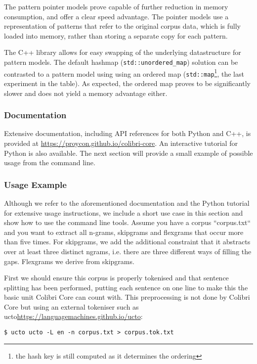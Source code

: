 \documentclass[a4paper,12pt]{article}
\begin{document}
The pattern pointer models prove capable of further reduction in memory
consumption, and offer a clear speed advantage. The pointer models use a
representation of patterns that refer to the original corpus data, which is
fully loaded into memory, rather than storing a separate copy for each pattern. 

The C++ library allows for easy swapping of the underlying datastructure for
pattern models. The default hashmap (\texttt{std::unordered\_map}) solution can
be contrasted to a pattern model using using an ordered map
(\texttt{std::map}\footnote{the hash key is still computed as it determines
the ordering}, the last experiment in the table). As expected, the ordered map proves to be significantly slower
and does not yield a memory advantage either.

\subsubsection{Documentation} 

Extensive documentation, including API references for both Python and C++, is provided at
\url{https://proycon.github.io/colibri-core}. An interactive tutorial for Python is also
available. The next section will provide a small example of possible usage from the command line.

\subsubsection{Usage Example}

Although we refer to the aforementioned documentation and the Python tutorial
for extensive usage instructions, we include a short use case in this section
and show how to use the command line tools.  Assume you have a corpus
``corpus.txt`` and you want to extract all n-grams, skipgrams and flexgrams
that occur more than five times. For skipgrams, we add the additional
constraint that it abstracts over at least three distinct ngrams, i.e. there
are three different ways of filling the gaps. Flexgrams we derive from
skipgrams.

First we should ensure this corpus is properly tokenised and that sentence
splitting has been performed, putting each sentence on one line to make this
the basic unit Colibri Core can count with. This preprocessing is not done by
Colibri Core but using an external tokeniser such as ucto\url{https://languagemachines.github.io/ucto}:

\begin{verbatim}
$ ucto ucto -L en -n corpus.txt > corpus.tok.txt
\end{verbatim}
\end{document}

